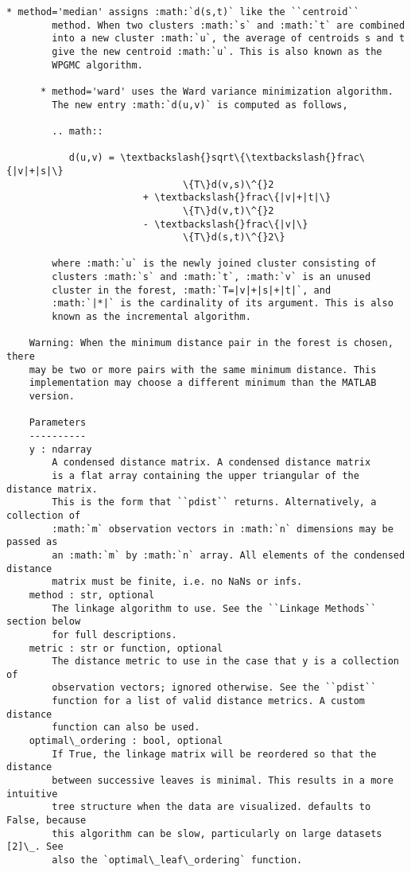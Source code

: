 \documentclass[11pt]{article}
\begin{document}
\begin{Verbatim}[commandchars=\\\{\}]
      * method='median' assigns :math:`d(s,t)` like the ``centroid``
        method. When two clusters :math:`s` and :math:`t` are combined
        into a new cluster :math:`u`, the average of centroids s and t
        give the new centroid :math:`u`. This is also known as the
        WPGMC algorithm.
    
      * method='ward' uses the Ward variance minimization algorithm.
        The new entry :math:`d(u,v)` is computed as follows,
    
        .. math::
    
           d(u,v) = \textbackslash{}sqrt\{\textbackslash{}frac\{|v|+|s|\}
                               \{T\}d(v,s)\^{}2
                        + \textbackslash{}frac\{|v|+|t|\}
                               \{T\}d(v,t)\^{}2
                        - \textbackslash{}frac\{|v|\}
                               \{T\}d(s,t)\^{}2\}
    
        where :math:`u` is the newly joined cluster consisting of
        clusters :math:`s` and :math:`t`, :math:`v` is an unused
        cluster in the forest, :math:`T=|v|+|s|+|t|`, and
        :math:`|*|` is the cardinality of its argument. This is also
        known as the incremental algorithm.
    
    Warning: When the minimum distance pair in the forest is chosen, there
    may be two or more pairs with the same minimum distance. This
    implementation may choose a different minimum than the MATLAB
    version.
    
    Parameters
    ----------
    y : ndarray
        A condensed distance matrix. A condensed distance matrix
        is a flat array containing the upper triangular of the distance matrix.
        This is the form that ``pdist`` returns. Alternatively, a collection of
        :math:`m` observation vectors in :math:`n` dimensions may be passed as
        an :math:`m` by :math:`n` array. All elements of the condensed distance
        matrix must be finite, i.e. no NaNs or infs.
    method : str, optional
        The linkage algorithm to use. See the ``Linkage Methods`` section below
        for full descriptions.
    metric : str or function, optional
        The distance metric to use in the case that y is a collection of
        observation vectors; ignored otherwise. See the ``pdist``
        function for a list of valid distance metrics. A custom distance
        function can also be used.
    optimal\_ordering : bool, optional
        If True, the linkage matrix will be reordered so that the distance
        between successive leaves is minimal. This results in a more intuitive
        tree structure when the data are visualized. defaults to False, because
        this algorithm can be slow, particularly on large datasets [2]\_. See 
        also the `optimal\_leaf\_ordering` function.
        

\end{Verbatim}
\end{document}
